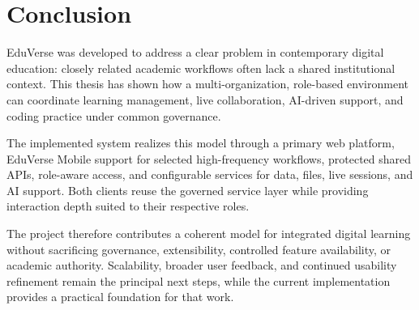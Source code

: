\chapter*{Conclusion}

EduVerse was developed to address a clear problem in contemporary digital
education: closely related academic workflows often lack a shared institutional
context. This thesis has shown how a multi-organization, role-based environment
can coordinate learning management, live collaboration, AI-driven support, and
coding practice under common governance.

The implemented system realizes this model through a primary web platform,
EduVerse Mobile support for selected high-frequency workflows, protected shared
APIs, role-aware access, and configurable services for data, files, live
sessions, and AI support. Both clients reuse the governed service layer while
providing interaction depth suited to their respective roles.

The project therefore contributes a coherent model for integrated digital
learning without sacrificing governance, extensibility, controlled feature
availability, or academic authority. Scalability, broader user feedback, and
continued usability refinement remain the principal next steps, while the
current implementation provides a practical foundation for that work.
